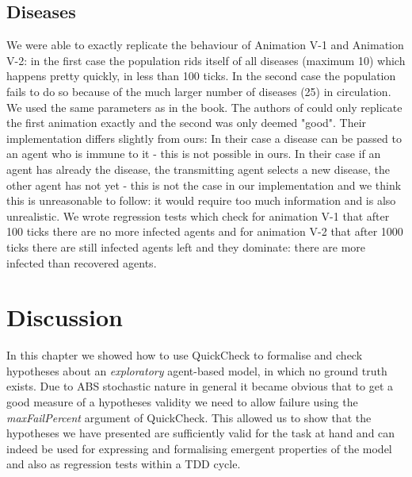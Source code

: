 \subsection{Diseases}
We were able to exactly replicate the behaviour of Animation V-1 and Animation V-2: in the first case the population rids itself of all diseases (maximum 10) which happens pretty quickly, in less than 100 ticks. In the second case the population fails to do so because of the much larger number of diseases (25) in circulation. We used the same parameters as in the book. 
The authors of \cite{weaver_replicating_2009} could only replicate the first animation exactly and the second was only deemed "good". Their implementation differs slightly from ours: In their case a disease can be passed to an agent who is immune to it - this is not possible in ours. In their case if an agent has already the disease, the transmitting agent selects a new disease, the other agent has not yet - this is not the case in our implementation and we think this is unreasonable to follow: it would require too much information and is also unrealistic.
We wrote regression tests which check for animation V-1 that after 100 ticks there are no more infected agents and for animation V-2 that after 1000 ticks there are still infected agents left and they dominate: there are more infected than recovered agents.

\section{Discussion}
In this chapter we showed how to use QuickCheck to formalise and check hypotheses about an \textit{exploratory} agent-based model, in which no ground truth exists. Due to ABS stochastic nature in general it became obvious that to get a good measure of a hypotheses validity we need to allow failure using the \textit{maxFailPercent} argument of QuickCheck. This allowed us to show that the hypotheses we have presented are sufficiently valid for the task at hand and can indeed be used for expressing and formalising emergent properties of the model and also as regression tests within a TDD cycle.

